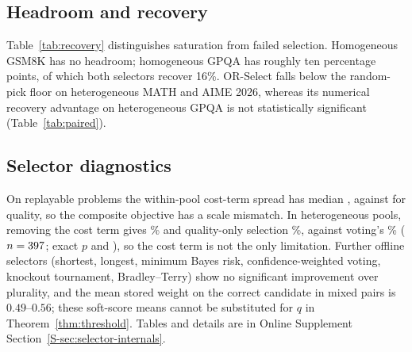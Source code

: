 \documentclass[preprint,11pt,number,sort&compress]{elsarticle}
\begin{document}
\subsection{Headroom and recovery}
\label{sec:recovery}

Table~\ref{tab:recovery} distinguishes saturation from failed selection.
Homogeneous GSM8K has no headroom; homogeneous GPQA has roughly ten
percentage points, of which both selectors recover 16\%.
OR-Select falls below the random-pick floor on heterogeneous MATH and
AIME 2026, whereas its numerical recovery advantage on heterogeneous GPQA
is not statistically significant (Table~\ref{tab:paired}).

\begin{table}[htbp]
\centering
\caption{Headroom and recovery on graded problems. Floor: mean candidate
accuracy. Oracle: some candidate correct. Recovery (\%):
$(\text{acc}-\text{floor})/(\text{oracle}-\text{floor})$; negative means
below a random pick.}
\label{tab:recovery}
\small\setlength{\tabcolsep}{4pt}
\end{table}

\subsection{Selector diagnostics}
\label{sec:selection-bias}

On replayable problems the within-pool cost-term spread has median \CostSpreadMed{}, against
\QualitySpreadMed{} for quality, so the composite objective has a scale mismatch. In heterogeneous pools,
removing the cost term gives \AblHetNoCostAcc\% and quality-only selection \AblHetQOnlyAcc\%, against voting's
\AblHetSCAcc\% ($n=397$; exact $p$ \AblHetNoCostP{} and \AblHetQOnlyP{}), so the cost term is not the only
limitation. Further offline selectors (shortest, longest, minimum Bayes risk, confidence-weighted voting,
knockout tournament, Bradley--Terry) show no significant improvement over plurality, and the mean stored weight
on the correct candidate in mixed pairs is $0.49$--$0.56$; these soft-score means cannot be substituted for $q$
in Theorem~\ref{thm:threshold}. Tables and details are in Online Supplement Section~\ref{S-sec:selector-internals}.
\end{document}
